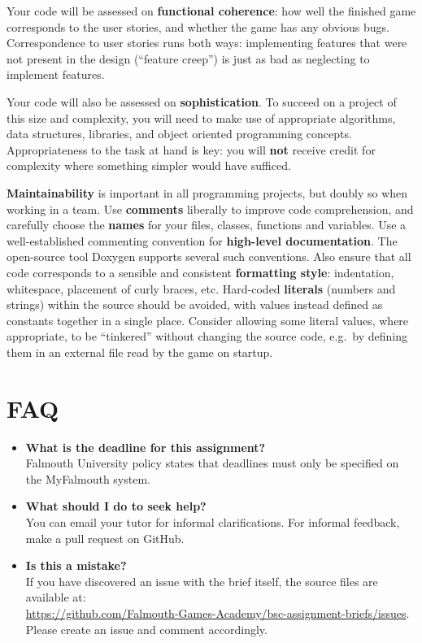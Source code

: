 \documentclass{../fal_assignment}
\begin{document}
Your code will be assessed on \textbf{functional coherence}:
how well the finished game corresponds to the user stories,
and whether the game has any obvious bugs.
Correspondence to user stories runs both ways:
implementing features that were not present in the design (``feature creep'')
is just as bad as neglecting to implement features.

Your code will also be assessed on \textbf{sophistication}.
To succeed on a project of this size and complexity,
you will need to make use of appropriate algorithms, data structures, libraries, and object oriented programming concepts.
Appropriateness to the task at hand is key:
you will \textbf{not} receive credit for complexity  
where something simpler would have sufficed.

\textbf{Maintainability} is important in all programming projects,
but doubly so when working in a team.
Use \textbf{comments} liberally to improve code comprehension,
and carefully choose the \textbf{names} for your files, classes, functions and variables.
Use a well-established commenting convention
for \textbf{high-level documentation}.
The open-source tool Doxygen supports several such conventions.
Also ensure that all code corresponds to a sensible and consistent \textbf{formatting style}:
indentation, whitespace, placement of curly braces, etc.
Hard-coded \textbf{literals} (numbers and strings) within the source should be avoided,
with values instead defined as constants together in a single place.
Consider allowing some literal values, where appropriate, to be ``tinkered'' without changing the source code,
e.g.\ by defining them in an external file read by the game on startup.

\section*{FAQ}

\begin{itemize}
	\item 	\textbf{What is the deadline for this assignment?} \\ 
    		Falmouth University policy states that deadlines must only be specified on the MyFalmouth system.
    		
	\item 	\textbf{What should I do to seek help?} \\ 
    		You can email your tutor for informal clarifications. For informal feedback, make a pull request on GitHub. 
    		
    	\item 	\textbf{Is this a mistake?} \\ 	
    		If you have discovered an issue with the brief itself, the source files are available at: \\
    		\url{https://github.com/Falmouth-Games-Academy/bsc-assignment-briefs/issues}.\\
    		 Please create an issue and comment accordingly.
\end{itemize}
\end{document}
